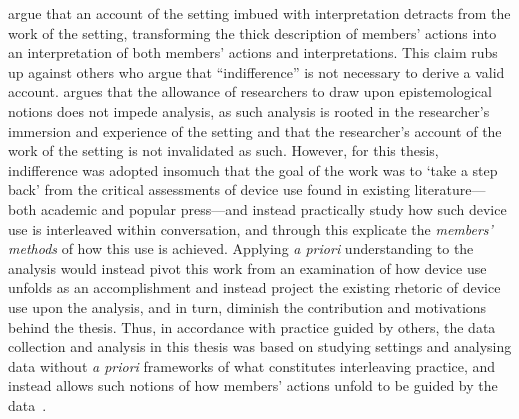 \begin{revisedsubmission}
\citet{Button2015} argue that an account of the setting imbued with interpretation detracts from the work of the setting, transforming the thick description of members' actions into an interpretation of both members' actions and interpretations.
This claim rubs up against others who argue that ``indifference'' is not necessary to derive a valid account.
\citet{Dourish2014} argues that the allowance of researchers to draw upon epistemological notions does not impede analysis, as such analysis is rooted in the researcher's immersion and experience of the setting and that the researcher's account of the work of the setting is not invalidated as such.
However, for this thesis, indifference was adopted insomuch that the goal of the work was to `take a step back' from the critical assessments of device use found in existing literature---both academic and popular press---and instead practically study how such device use is interleaved within conversation, and through this explicate the \textit{members' methods} of how this use is achieved.
Applying \textit{a priori} understanding to the analysis would instead pivot this work from an examination of how device use unfolds as an accomplishment and instead project the existing rhetoric of device use upon the analysis, and in turn, diminish the contribution and motivations behind the thesis.
Thus, in accordance with practice guided by others, the data collection and analysis in this thesis was based on studying settings and analysing data without \textit{a priori} frameworks of what constitutes interleaving practice, and instead allows such notions of how members' actions unfold to be guided by the data~\citep{Crabtree2012,Heath2010}.
\end{revisedsubmission}





